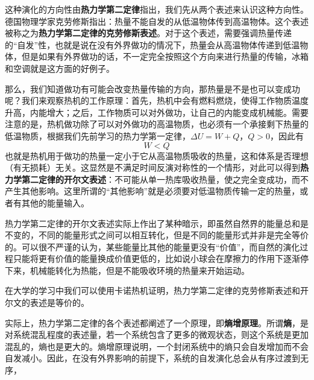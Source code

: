 这种演化的方向性由\textbf{热力学第二定律}指出，我们先从两个表述来认识这种方向性。德国物理学家克劳修斯指出：热量不能自发的从低温物体传到高温物体。这个表述被称之为\textbf{热力学第二定律的克劳修斯表述}。对于这个表述，需要强调热量传递的“自发”性，也就是说在没有外界做功的情况下，热量会从高温物体传递到低温物体，但是如果有外界做功的话，不一定完全按照这个方向来进行热量的传输，冰箱和空调就是这方面的好例子。

那么，我们知道做功有可能会改变热量传输的方向，那热量是不是也可以变成功呢？我们来观察热机的工作原理：首先，热机中会有燃料燃烧，使得工作物质温度升高，内能增大；之后，工作物质可以对外做功，让自己的内能变成机械能。需要注意的是，热机做功除了可以对外做功的高温物质，也必须有一个承接剩下热量的低温物质，根据我们先前学习的热力学第一定律，$\Delta U=W+Q$，$Q>0$，因此有$$W<Q$$也就是热机用于做功的热量一定小于它从高温物质吸收的热量，这和体系是否理想（有无损耗）无关。这显然是不满足时间反演对称性的一个情形，对此可以得到\textbf{热力学第二定律的开尔文表述}：不可能从单一热库吸收热量，使之完全变成功，而不产生其他影响。这里所谓的“其他影响”就是必须要对低温物质传输一定的热量，或者有其他的能量输入。

热力学第二定律的开尔文表述实际上作出了某种暗示，即虽然自然界的能量总和是不变的，不同的能量形式之间可以相互转化，但是不同的能量形式并非是完全等价的。可以很不严谨的认为，某些能量比其他的能量更没有“价值”，而自然的演化过程只能将更有价值的能量换成价值更低的，比如说小球会在摩擦力的作用下逐渐停下来，机械能转化为热能，但是不能吸收环境的热量来开始运动。

在大学的学习中我们可以使用卡诺热机证明，热力学第二定律的克劳修斯表述和开尔文的表述是等价的。

实际上，热力学第二定律的各个表述都阐述了一个原理，即\textbf{熵增原理}。所谓\textbf{熵}，是对系统混乱程度的表述量，若一个系统包含了更多的微观状态，则这个系统是更加混乱的，熵也是更大的。熵增原理说明，一个封闭系统中的熵只会自发增加而不会自发减小。因此，在没有外界影响的前提下，系统的自发演化总会从有序过渡到无序，


